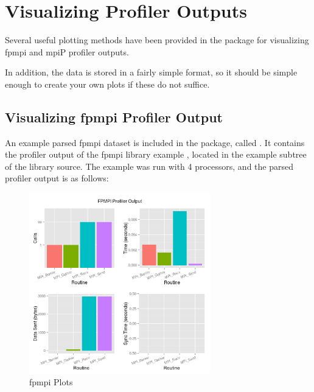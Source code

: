 \section{Visualizing Profiler Outputs}

Several useful plotting methods have been provided in the  package for visualizing fpmpi and mpiP profiler outputs.  

In addition, the data is stored in a fairly simple format, so it should be simple enough to create your own plots if these do not suffice.

\subsection{Visualizing fpmpi Profiler Output}

An example parsed fpmpi dataset is included in the  package, called .  It contains the profiler output of the fpmpi library example , located in the example subtree of the library source.  The example was run with 4 processors, and the parsed profiler output is as follows:

\begin{figure}[h]
  \centering
  \includegraphics[width=0.7\textwidth]{include/pics/fpmpi}
  \caption{fpmpi Plots}
  \label{fig:fpmpi}
\end{figure}

